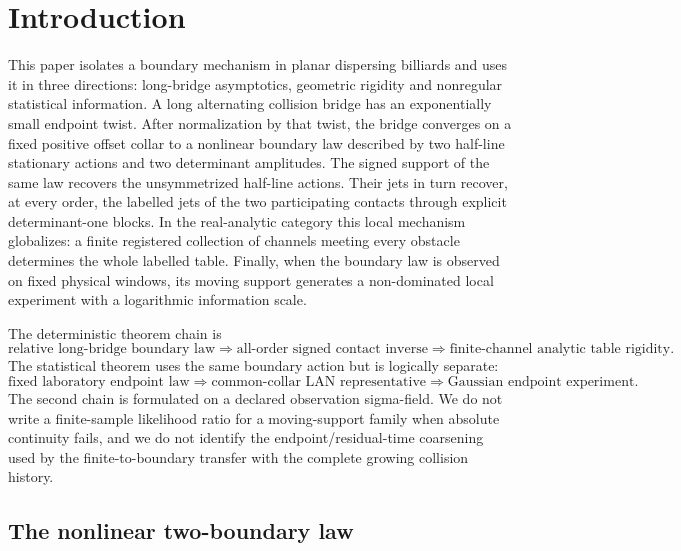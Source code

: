 \section{Introduction}
\label{sec:introduction}

This paper isolates a boundary mechanism in planar dispersing billiards and
uses it in three directions: long-bridge asymptotics, geometric rigidity and
nonregular statistical information.  A long alternating collision bridge has
an exponentially small endpoint twist.  After normalization by that twist,
the bridge converges on a fixed positive offset collar to a nonlinear boundary
law described by two half-line stationary actions and two determinant
amplitudes.  The signed support of the same law recovers the unsymmetrized
half-line actions.  Their jets in turn recover, at every order, the labelled
jets of the two participating contacts through explicit determinant-one
blocks.  In the real-analytic category this local mechanism globalizes: a
finite registered collection of channels meeting every obstacle determines
the whole labelled table.  Finally, when the boundary law is observed on
fixed physical windows, its moving support generates a non-dominated local
experiment with a logarithmic information scale.

The deterministic theorem chain is
\[
 \boxed{\text{relative long-bridge boundary law}}
 \Longrightarrow
 \boxed{\text{all-order signed contact inverse}}
 \Longrightarrow
 \boxed{\text{finite-channel analytic table rigidity}}.
\]
The statistical theorem uses the same boundary action but is logically
separate:
\[
 \boxed{\text{fixed laboratory endpoint law}}
 \Longrightarrow
 \boxed{\text{common-collar LAN representative}}
 \Longrightarrow
 \boxed{\text{Gaussian endpoint experiment}}.
\]
The second chain is formulated on a declared observation sigma-field.  We do
not write a finite-sample likelihood ratio for a moving-support family when
absolute continuity fails, and we do not identify the endpoint/residual-time
coarsening used by the finite-to-boundary transfer with the complete growing
collision history.

\subsection{The nonlinear two-boundary law}

